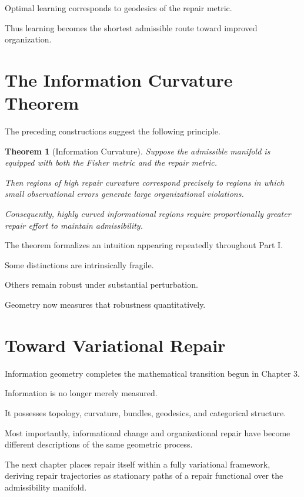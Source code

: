 \documentclass[11pt,oneside]{book}
\numberwithin{equation}{chapter}
\theoremstyle{definition}
\theoremstyle{plain}
\newtheorem{theorem}[definition]{Theorem}
\begin{document}
Optimal learning corresponds to geodesics of the repair metric.

Thus learning becomes the shortest admissible route toward improved
organization.

\section{The Information Curvature Theorem}

The preceding constructions suggest the following principle.

\begin{theorem}[Information Curvature]

Suppose the admissible manifold is equipped with both the Fisher metric and
the repair metric.

Then regions of high repair curvature correspond precisely to regions in
which small observational errors generate large organizational violations.

Consequently, highly curved informational regions require proportionally
greater repair effort to maintain admissibility.

\end{theorem}

The theorem formalizes an intuition appearing repeatedly throughout Part I.

Some distinctions are intrinsically fragile.

Others remain robust under substantial perturbation.

Geometry now measures that robustness quantitatively.

\section{Toward Variational Repair}

Information geometry completes the mathematical transition begun in Chapter
3.

Information is no longer merely measured.

It possesses topology, curvature, bundles, geodesics, and categorical
structure.

Most importantly, informational change and organizational repair have become
different descriptions of the same geometric process.

The next chapter places repair itself within a fully variational framework,
deriving repair trajectories as stationary paths of a repair functional over
the admissibility manifold.
\end{document}
